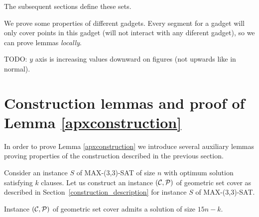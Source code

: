 The subsequent sections define these sets.

We prove some properties of different gadgets.
Every segment for a gadget will only cover points 
in this gadget (will not interact with any diferent gadget),
so we can prove lemmas \textit{locally}.


TODO: $y$ axis is increasing values downward on figures
(not upwards like in normal).


\section{Construction lemmas and proof of Lemma \ref{apxconstruction}}
\newcommand{\setCoverInstance}{(\points, \sets)}
\newcommand{\true}{\texttt{true}}
\newcommand{\false}{\texttt{false}}

In order to prove Lemma \ref{apxconstruction} we introduce several
auxiliary lemmas proving properties of the construction
described in the previous section.

Consider an instance $S$ of MAX-(3,3)-SAT of size $n$
with optimum solution satisfying $k$ clauses.
Let us construct an instance $\setCoverInstance$ of geometric set cover
as described in Section~\ref{construction_description}
for instance $S$ of MAX-(3,3)-SAT.

\begin{lemma}
	\label{construction_correctness}
	Instance $\setCoverInstance$ of geometric set cover
	admits a solution of size $15n - k$.
\end{lemma}

